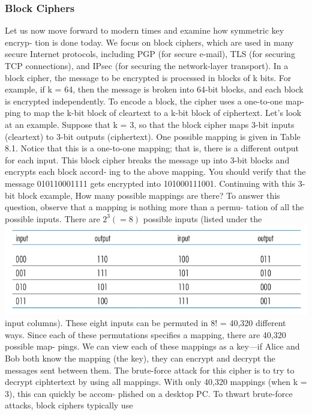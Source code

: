 \documentclass{report}
\theoremstyle{definition}
\begin{document}
{{{\subsubsection{Block Ciphers}
Let us now move forward to modern times and examine how symmetric key encryp-
tion is done today. We focus on block ciphers, which are used in many secure Internet
protocols, including PGP (for secure e-mail), TLS (for securing TCP connections),
and IPsec (for securing the network-layer transport).
In a block cipher, the message to be encrypted is processed in blocks of k bits.
For example, if k = 64, then the message is broken into 64-bit blocks, and each block
is encrypted independently. To encode a block, the cipher uses a one-to-one map-
ping to map the k-bit block of cleartext to a k-bit block of ciphertext. Let’s look at an
example. Suppose that k = 3, so that the block cipher maps 3-bit inputs (cleartext)
to 3-bit outputs (ciphertext). One possible mapping is given in Table 8.1. Notice that
this is a one-to-one mapping; that is, there is a different output for each input. This
block cipher breaks the message up into 3-bit blocks and encrypts each block accord-
ing to the above mapping. You should verify that the message 010110001111 gets
encrypted into 101000111001.
Continuing with this 3-bit block example, How many possible mappings are
there? To answer this question, observe that a mapping is nothing more than a permu-
tation of all the possible inputs. There are $2^3 (= 8)$ possible inputs (listed under the
\includegraphics[scale=0.5]{block}\newline
input columns). These eight inputs can be permuted in 8! = 40,320 different ways.
Since each of these permutations specifies a mapping, there are 40,320 possible map-
pings. We can view each of these mappings as a key—if Alice and Bob both know
the mapping (the key), they can encrypt and decrypt the messages sent between them.
The brute-force attack for this cipher is to try to decrypt ciphtertext by using all
mappings. With only 40,320 mappings (when k = 3), this can quickly be accom-
plished on a desktop PC. To thwart brute-force attacks, block ciphers typically use
}}}
\end{document}
